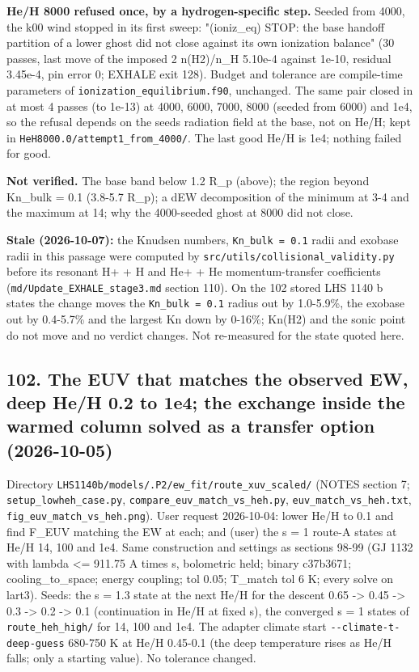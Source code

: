 \documentclass[english,a4paper]{my_memo}
\begin{document}
\textbf{He/H 8000 refused once, by a hydrogen-specific step.} Seeded from 4000,
the k00 wind stopped in its first sweep: "(ioniz\_eq) STOP: the base handoff
partition of a lower ghost did not close against its own ionization
balance" (30 passes, last move of the imposed 2 n(H2)/n\_H 5.10e-4 against
1e-10, residual 3.45e-4, pin error 0; EXHALE exit 128). Budget and tolerance
are compile-time parameters of \texttt{ionization\_equilibrium.f90}, unchanged. The
same pair closed in at most 4 passes (to 1e-13) at 4000, 6000, 7000, 8000
(seeded from 6000) and 1e4, so the refusal depends on the seed\textquotesingle s radiation
field at the base, not on He/H; kept in \texttt{HeH8000.0/attempt1\_from\_4000/}.
The last good He/H is 1e4; nothing failed for good.

\textbf{Not verified.} The base band below 1.2 R\_p (above); the region beyond
Kn\_bulk = 0.1 (3.8-5.7 R\_p); a dEW decomposition of the minimum at 3-4 and
the maximum at 14; why the 4000-seeded ghost at 8000 did not close.

\textbf{Stale (2026-10-07):} the Knudsen numbers, \texttt{Kn\_bulk\ =\ 0.1} radii and exobase radii in this passage were computed by \texttt{src/utils/collisional\_validity.py} before its resonant H+ + H and He+ + He momentum-transfer coefficients (\texttt{md/Update\_EXHALE\_stage3.md} section 110). On the 102 stored LHS 1140 b states the change moves the \texttt{Kn\_bulk\ =\ 0.1} radius out by 1.0-5.9\%, the exobase out by 0.4-5.7\% and the largest Kn down by 0-16\%; Kn(H2) and the sonic point do not move and no verdict changes. Not re-measured for the state quoted here.

\subsection{102. The EUV that matches the observed EW, deep He/H 0.2 to 1e4; the exchange inside the warmed column solved as a transfer option (2026-10-05)}\label{102-the-euv-that-matches-the-observed-ew-deep-heh-02-to-1e4-the-exchange-inside-the-warmed-column-solved-as-a-transfer-option-2026-10-05}

Directory \texttt{LHS1140b/models/.P2/ew\_fit/route\_xuv\_scaled/} (NOTES section 7;
\texttt{setup\_lowheh\_case.py}, \texttt{compare\_euv\_match\_vs\_heh.py},
\texttt{euv\_match\_vs\_heh.txt}, \texttt{fig\_euv\_match\_vs\_heh.png}). User request
2026-10-04: lower He/H to 0.1 and find F\_EUV matching the EW at each; and
(user) the s = 1 route-A states at He/H 14, 100 and 1e4. Same construction
and settings as sections 98-99 (GJ 1132 with lambda \textless= 911.75 A times s,
bolometric held; binary c37b3671; cooling\_to\_space; energy coupling; tol
0.05; T\_match tol 6 K; every solve on lart3). Seeds: the s = 1.3 state at
the next He/H for the descent 0.65 -\textgreater{} 0.45 -\textgreater{} 0.3 -\textgreater{} 0.2 -\textgreater{} 0.1 (continuation
in He/H at fixed s), the converged s = 1 states of
\texttt{route\_heh\_high/} for 14, 100 and 1e4. The adapter climate start
\texttt{-\/-climate-t-deep-guess} 680-750 K at He/H 0.45-0.1 (the deep temperature
rises as He/H falls; only a starting value). No tolerance changed.
\end{document}
